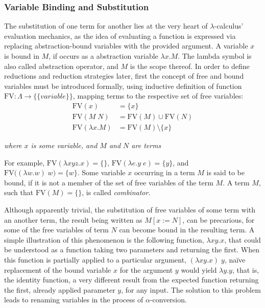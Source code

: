 \documentclass[a4paper,10pt]{article}
\begin{document}
\subsubsection{Variable Binding and Substitution}
The substitution of one term for another lies at the very heart of $\lambda$-calculus'
evaluation mechanics, as the idea of evaluating a function is expressed via replacing
abstraction-bound variables with the provided argument. A variable $x$ is bound in $M$,
if occurs as a abstraction variable $\lambda x.M$. The lambda symbol is also called
abstraction operator, and $M$ is the scope thereof. In order to define
reductions and reduction strategies later, first the concept of free
and bound variables must be introduced formally, using inductive definition
of function $\mathrm{FV} : \Lambda \to \big\{\{variable\}\big\}$, mapping 
terms to the respective set of free variables:
\begin{align*}
	\mathrm{FV}(x) &= \{x\} \\
    \mathrm{FV}(M\;N) &= \mathrm{FV}(M) \cup \mathrm{FV}(N) \\
	\mathrm{FV}(\lambda x.M) &= \mathrm{FV}(M) \setminus \{x\}
\end{align*}
\begin{center}
\textit{where $x$ is some variable, and $M$ and $N$ are terms}
\end{center}
For example, $\mathrm{FV}(\lambda x y z.x) = \{\}$, $\mathrm{FV}(\lambda e.y\;e) = \{y\}$,
and $\mathrm{FV}\big((\lambda w.w)\;w\big) = \{w\}$. Some variable $x$ occurring in a term $M$ is
said to be bound, if it is not a member of the set of free variables of the term $M$.
A term $M$, such that $\mathrm{FV}(M) = \{\}$, is called \textit{combinator}.

Although apparently trivial, the substitution of free variables of some term with an another term,
the result being written as $M[x := N]$, can be precarious, for some of the 
free variables of term $N$ can become bound in the resulting term. A simple illustration of this
phenomenon is the following function, $\lambda xy.x$, that could be understood as a function
taking two parameters and returning the first. When this function is partially
applied to a particular argument, $(\lambda xy.x)\;y$, na\"ive replacement of 
the bound variable $x$ for the argument $y$ would yield
$\lambda y.y$, that is, the identity function, a very different result from the expected function returning
the first, already applied parameter $y$, for any input. The solution to this problem leads
to renaming variables in the process of $\alpha$-conversion.
\end{document}
